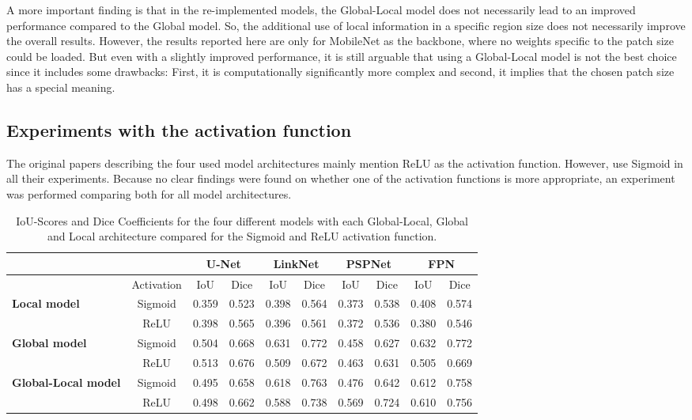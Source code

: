 A more important finding is that in the re-implemented models, the Global-Local model does not necessarily lead to an improved performance compared to the Global model. So, the additional use of local information in a specific region size does not necessarily improve the overall results. However, the results reported here are only for MobileNet as the backbone, where no weights specific to the patch size could be loaded. But even with a slightly improved performance, it is still arguable that using a Global-Local model is not the best choice since it includes some drawbacks: First, it is computationally significantly more complex and second, it implies that the chosen patch size has a special meaning.

\subsection{Experiments with the activation function}

The original papers describing the four used model architectures mainly mention ReLU as the activation function. However, \citeauthor{Oota_2023_WACV} use Sigmoid in all their experiments. Because no clear findings were found on whether one of the activation functions is more appropriate, an experiment was performed comparing both for all model architectures.

\begin{table}[htb!]
	\centering
	\begin{tabular}{l | c ||c | c || c | c || c | c || c | c||}
	& & \multicolumn{2}{|c||}{U-Net} & \multicolumn{2}{|c||}{LinkNet} & \multicolumn{2}{|c||}{PSPNet} & \multicolumn{2}{|c||}{FPN} \\
	\hline
	& Activation & IoU & Dice & IoU & Dice & IoU & Dice & IoU & Dice \\
	\hline\hline
	\multirow{2}{*}{\textbf{Local model}} & Sigmoid & 0.359 & 0.523 & 0.398 & 0.564 & 0.373 & 0.538 & 0.408 & 0.574 \\
	& ReLU & 0.398 & 0.565 & 0.396 & 0.561 & 0.372 & 0.536 & 0.380 & 0.546 \\
	\hline
	\multirow{2}{*}{\textbf{Global model}} & Sigmoid & 0.504 & 0.668 & 0.631 & 0.772 & 0.458 & 0.627 & 0.632 & 0.772 \\
	& ReLU & 0.513 & 0.676 & 0.509 & 0.672 & 0.463 & 0.631 & 0.505 & 0.669 \\
	\hline
	\multirow{2}{*}{\textbf{Global-Local model}} & Sigmoid & 0.495 & 0.658 & 0.618 & 0.763 & 0.476 & 0.642 & 0.612 & 0.758\\
	& ReLU & 0.498 & 0.662 & 0.588 & 0.738 & 0.569 & 0.724 & 0.610 & 0.756 \\
	\end{tabular}
	\caption{IoU-Scores and Dice Coefficients for the four different models with each Global-Local, Global and Local architecture compared for the Sigmoid and ReLU activation function.}
	\label{table:sigmoid-relu-comparison}
\end{table}

